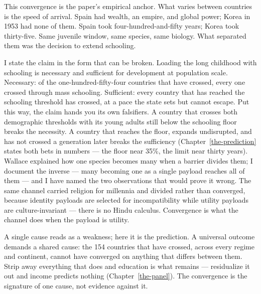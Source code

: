 \documentclass[12pt,letterpaper]{article}
\begin{document}
This convergence is the paper's empirical anchor. What varies between
countries is the speed of arrival. Spain had wealth, an empire, and
global power; Korea in 1953 had none of them. Spain took
four-hundred-and-fifty years; Korea took thirty-five. Same juvenile
window, same species, same biology. What separated them was the decision to
extend schooling.

I state the claim in the form that can be broken. Loading the long
childhood with schooling is necessary and sufficient for development at
population scale. Necessary: of the one-hundred-fifty-four countries that
have crossed, every one crossed through mass schooling. Sufficient: every
country that has reached the schooling threshold has crossed, at a pace the
state sets but cannot escape. Put this way, the claim hands you its own
falsifiers. A country that crosses both demographic thresholds with its
young adults still below the schooling floor breaks the necessity. A
country that reaches the floor, expands undisrupted, and has not crossed a
generation later breaks the sufficiency
(Chapter~\ref{the-prediction} states both bets in numbers --- the floor
near 35\%, the limit near thirty years). Wallace explained how one species
becomes many when a barrier divides them; I document the inverse --- many
becoming one as a single payload reaches all of them --- and I have named
the two observations that would prove it wrong. The same channel carried
religion for millennia and divided rather than converged, because identity
payloads are selected for incompatibility while utility payloads are
culture-invariant --- there is no Hindu calculus. Convergence is what the
channel does when the payload is utility.

A single cause reads as a weakness; here it is the prediction. A universal
outcome demands a shared cause: the 154 countries that have crossed, across
every regime and continent, cannot have converged on anything that differs
between them. Strip away everything that does and education is what remains
--- residualize it out and income predicts nothing
(Chapter~\ref{the-panel}). The convergence is the signature of one cause,
not evidence against it.
\end{document}
